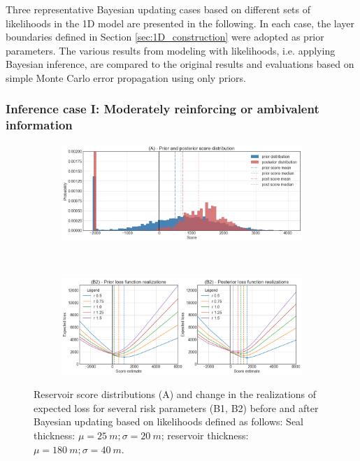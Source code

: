 			Three representative Bayesian updating cases based on different sets of likelihoods in the 1D model are presented in the following. In each case, the layer boundaries defined in Section \ref{sec:1D_construction} were adopted as prior parameters. The various results from modeling with likelihoods, i.e. applying Bayesian inference, are compared to the original results and evaluations based on simple Monte Carlo error propagation using only priors.
				
				\subsubsection{Inference case I: Moderately reinforcing or ambivalent information}
				\begin{figure}[h]
					\begin{subfigure}{1\textwidth}
						\centering
						\includegraphics[width=1\linewidth]{Figures/update_moderate2.png}
					\end{subfigure}%
					\\
					\begin{subfigure}{1\textwidth}
						\centering
						\includegraphics[width=1\linewidth]{Figures/update_moderate3.png}
					\end{subfigure}
					\caption{Reservoir score distributions (A) and change in the realizations of expected loss for several risk parameters (B1, B2) before and after Bayesian updating based on likelihoods defined as follows: Seal thickness: $\mu = 25~m; \sigma = 20~m$; reservoir thickness: $\mu = 180~m; \sigma = 40~m$.}
					\label{fig:update_moderate2_3}
				\end{figure}				
